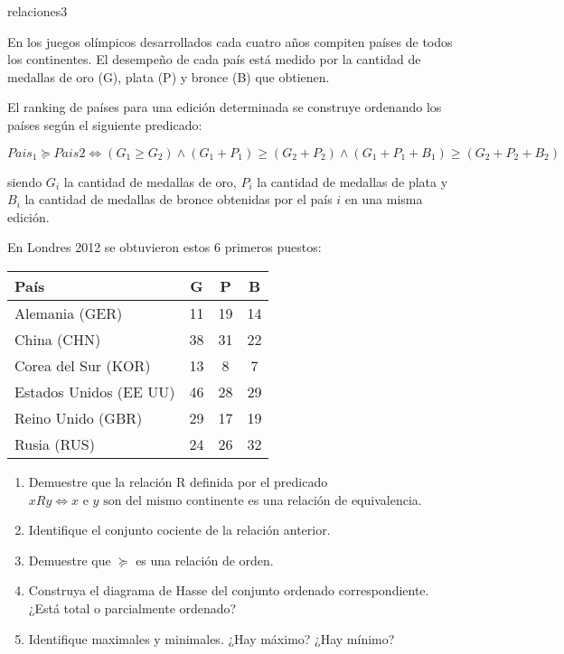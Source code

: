 \begin{defproblem}{relaciones3}%
	\begin{onlyproblem}%
		En los juegos olímpicos desarrollados cada cuatro años compiten países de todos los continentes. El desempeño de cada país está medido por la cantidad de medallas de oro (G), plata (P) y bronce (B) que obtienen.
		
		El ranking de países para una edición determinada se construye ordenando los países según el siguiente predicado:
		
		\[ Pais_1 \succeq Pais2 \Leftrightarrow (G_1 \ge G_2) \land (G_1 + P_1) \ge (G_2 + P_2) \land (G_1+P_1+B_1) \ge (G_2+P_2+B_2) \]
		
		siendo $ G_i $ la cantidad de medallas de oro, $ P_i $ la cantidad de medallas de plata y $ B_i $ la cantidad de medallas de bronce obtenidas por el país $ i $ en una misma edición.
		
		En Londres 2012 se obtuvieron estos 6 primeros puestos: 
		
		\begin{tabular}{|lccc|}
			\hline
			País & G & P & B \\
			\hline
			Alemania (GER)  & 11 & 19 & 14 \\
			China (CHN)  & 38 & 31 & 22 \\
			Corea del Sur (KOR)  & 13 & 8 & 7 \\
			Estados Unidos (EE UU)  & 46 & 28 & 29 \\
			Reino Unido (GBR)  & 29 & 17 & 19 \\
			Rusia (RUS)  & 24 & 26 & 32 \\
			\hline
		\end{tabular}
	
		\begin{enumerate}
			\item Demuestre que la relación R definida por el predicado $ x R y \Leftrightarrow x \text{ e } y \text{ son del mismo continente} $ es una relación de equivalencia.
			\item Identifique el conjunto cociente de la relación anterior.
			\item Demuestre que $ \succeq $ es una relación de orden.
			\item Construya el diagrama de Hasse del conjunto ordenado correspondiente. ¿Está total o parcialmente ordenado?
			\item Identifique maximales y minimales. ¿Hay máximo? ¿Hay mínimo?
		\end{enumerate}
		
	\end{onlyproblem}%
	\begin{onlysolution}%
		
	\end{onlysolution}%
\end{defproblem}

